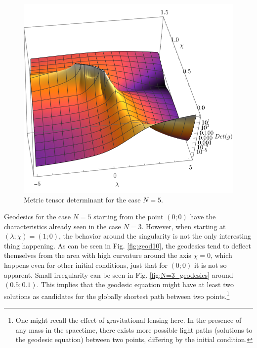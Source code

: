 \begin{figure}[H]
    \centering
    \includegraphics[scale=1.3]{../img/N=5_det3D.pdf}
    \caption{Metric tensor determinant for the case $N=5$.}
    \label{fig:N=5_det3D}    
\end{figure}



Geodesics for the case $N=5$ starting from the point $(0;0)$ have the characteristics already seen in the case $N=3$. However, when starting at $(\lambda;\chi)=(1;0)$, the behavior around the singularity is not the only interesting thing happening. As can be seen in Fig. \ref{fig:geod10}, the geodesics tend to deflect themselves from the area with high curvature around the axis $\chi=0$, which happens even for other initial conditions, just that for $(0;0)$ it is not so apparent. Small irregularity can be seen in Fig. \ref{fig:N=3_geodesics} around $(0.5;0.1)$. This implies that the geodesic equation might have at least two solutions as candidates for the globally shortest path between two points.\footnote{One might recall the effect of gravitational lensing here. In the presence of any mass in the spacetime, there exists more possible light paths (solutions to the geodesic equation) between two points, differing by the initial condition.} 



